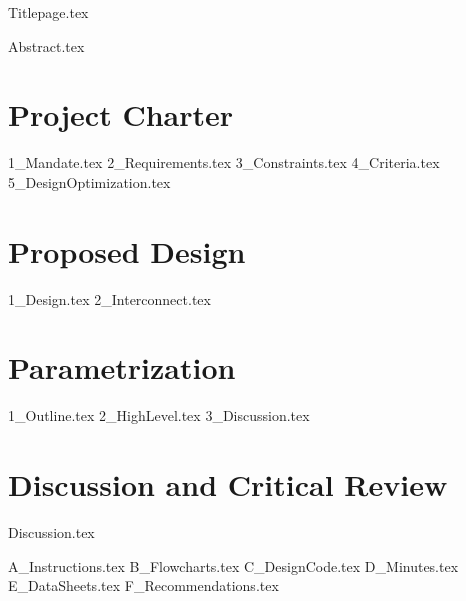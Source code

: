 \documentclass[letterpaper,12pt,onecolumn,titlepage,twoside]{article}
\begin{document}
{Titlepage.tex}

\clearpage\mbox{}\clearpage %

{Abstract.tex}

\clearpage\mbox{}\clearpage %


\tableofcontents

\newpage

\listoffigures
\listoftables

\newpage

\clearpage\mbox{}\clearpage %


\section{Project Charter} \label{sec:charter}
{1_Mandate.tex}
{2_Requirements.tex}
{3_Constraints.tex}
{4_Criteria.tex}
{5_DesignOptimization.tex}

\newpage

\section{Proposed Design} \label{sec:proposed_design}
{1_Design.tex}
{2_Interconnect.tex}

\newpage

\section{Parametrization} \label{sec:parametrization}
{1_Outline.tex}
{2_HighLevel.tex}
{3_Discussion.tex}

\newpage

\section{Discussion and Critical Review} \label{sec:discussion}
{Discussion.tex}

\newpage




\newpage

\begin{appendices}
    {A_Instructions.tex}
    {B_Flowcharts.tex}
    {C_DesignCode.tex}
    {D_Minutes.tex}
    {E_DataSheets.tex}
    \newpage
    {F_Recommendations.tex}
\end{appendices}
\end{document}
